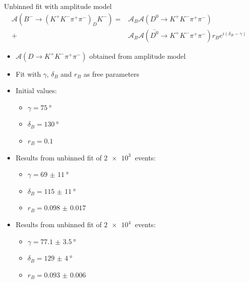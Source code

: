 \documentclass{beamer}
\begin{document}
\begin{frame}{Unbinned fit with amplitude model}
  \begin{align*}
    \mathcal{A}(B^-\to(K^+K^-\pi^+\pi^-)_DK^-) =& \mathcal{A}_B\mathcal{A}(D^0\to K^+K^-\pi^+\pi^-) \\
  +& \mathcal{A}_B\mathcal{A}(\bar{D^0}\to K^+K^-\pi^+\pi^-)r_Be^{i(\delta_B - \gamma)}
  \end{align*}
  \begin{itemize}
    \item{$\mathcal{A}(D\to K^+K^-\pi^+\pi^-)$ obtained from amplitude model}
    \item{Fit with $\gamma$, $\delta_B$ and $r_B$ as free parameters}
    \item{Initial values:}
    \begin{itemize}
      \item{$\gamma = \SI{75}{\degree}$}
      \item{$\delta_B = \SI{130}{\degree}$}
      \item{$r_B = \SI{0.1}{}$}
    \end{itemize}
    \item{Results from unbinned fit of $\SI{2e3}{}$ events:}
    \begin{itemize}
      \item{$\gamma = \SI{69(11)}{\degree}$}
      \item{$\delta_B = \SI{115(11)}{\degree}$}
      \item{$r_B = \SI{0.098(17)}{}$}
    \end{itemize}
    \item{Results from unbinned fit of $\SI{2e4}{}$ events:}
    \begin{itemize}
      \item{$\gamma = \SI{77.1(35)}{\degree}$}
      \item{$\delta_B = \SI{129(4)}{\degree}$}
      \item{$r_B = \SI{0.093(6)}{}$}
    \end{itemize}
  \end{itemize}
\end{frame}
\end{document}
